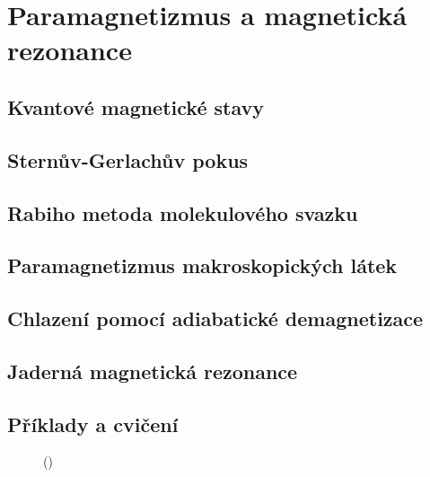 \setchaptertoc
\chapter{Paramagnetizmus a magnetická rezonance}\label{fyz:IIchapXXXV}

  \section{Kvantové magnetické stavy}\label{fyz:IIchapXXXVsecI}
  \section{Sternův-Gerlachův pokus}\label{fyz:IIchapXXXVsecII}
  \section{Rabiho metoda molekulového svazku}\label{fyz:IIchapXXXVsecIII}
  \section{Paramagnetizmus makroskopických látek}\label{fyz:IIchapXXXVsecIV}
  \section{Chlazení pomocí adiabatické demagnetizace}\label{fyz:IIchapXXXVsecV}
  \section{Jaderná magnetická rezonance}\label{fyz:IIchapXXXVsecVI}
  \section{Příklady a cvičení}\label{fyz:IIchapXXXVsecVII}

    \begin{figure}[ht!] %
      \centering
                     \newline
                     \newline
      \caption{
               (\cite[s.~748]{Feynman02})}
      \label{fyz:fig846}
    \end{figure}

